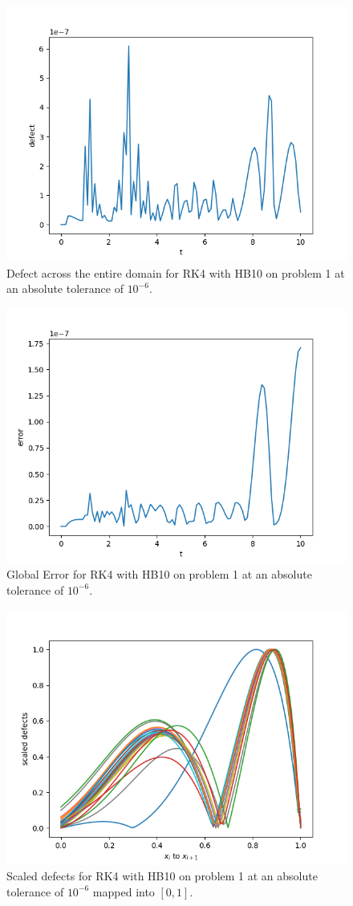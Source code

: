 \begin{figure}[H]
\centering
\includegraphics[width=0.7\linewidth]{./figures/rk4_with_hb10_p1_global_defect}
\caption{Defect across the entire domain for RK4 with HB10 on problem 1 at an absolute tolerance of $10^{-6}$.}
\label{fig:rk4_with_hb10_p1_global_defect}
\end{figure}

\begin{figure}[H]
\centering
\includegraphics[width=0.7\linewidth]{./figures/rk4_with_hb10_p1_global_error}
\caption{Global Error for RK4 with HB10 on problem 1 at an absolute tolerance of $10^{-6}$.}
\label{fig:rk4_with_hb10_p1_global_error}
\end{figure}

\begin{figure}[H]
\centering
\includegraphics[width=0.7\linewidth]{./figures/rk4_with_hb10_p1_scaled_defects}
\caption{Scaled defects for RK4 with HB10 on problem 1 at an absolute tolerance of $10^{-6}$ mapped into $[0, 1]$.}
\label{fig:rk4_with_hb10_p1_scaled_defects}
\end{figure}

